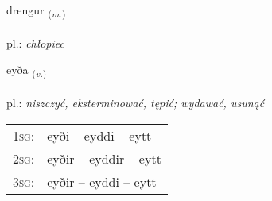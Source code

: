 \documentclass[frontgrid, backgrid]{flacards}\usepackage[]{graphicx}\usepackage[]{xcolor}
\begin{document}
\renewcommand{\blhead}{\vskip5pt {\small\bfseries\footnotesize Nafnorð | rzeczownik }}
\renewcommand{\bcfoot}{\vskip5pt \hspace{2pt}{\small\bfseries\footnotesize 1K}}


{drengur \small{\textsubscript{(\textit{m.})}} \\[1ex] %
\textphonetic{[treiŋkʏr]} \\
pl.: \emph{chłopiec} \\  [2ex]
\renewcommand*{\arraystretch}{0.8}
}

\renewcommand{\flhead}{\vskip5pt \fboxsep=0pt {\small\bfseries\footnotesize Sagnorð | czasownik}}
\renewcommand{\fcfoot}{\vskip5pt \fboxsep=0pt \hspace{2pt}{\small\bfseries\footnotesize 1K}}

\renewcommand{\blhead}{\vskip5pt {\small\bfseries\footnotesize Sagnorð | czasownik }}
\renewcommand{\bcfoot}{\vskip5pt \hspace{2pt}{\small\bfseries\footnotesize 1K}}


{eyða \small{\textsubscript{(\textit{v.})}} \\[1ex] %
\textphonetic{[eiːða]} \\
pl.: \emph{niszczyć, eksterminować, tępić; wydawać, usunąć} \\  [2ex]
\renewcommand*{\arraystretch}{0.8}
\begin{tabular}{p{1cm}l}
\textsc{1sg}: & eyði -- eyddi -- eytt \\ 
\textsc{2sg}: & eyðir -- eyddir -- eytt \\ 
\textsc{3sg}: & eyðir -- eyddi -- eytt \\ 
\end{tabular}
}
\end{document}
